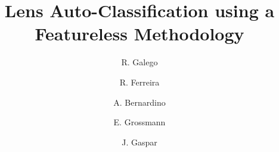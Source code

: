 \documentclass[letterpaper]{llncs}
\title{Lens Auto-Classification using a Featureless Methodology}
\author{R. Galego\inst{1} \and R. Ferreira\inst{1} \and A. Bernardino\inst{1} \and E. Grossmann\inst{2} \and J. Gaspar\inst{1}
}
\institute{Institute for Systems and Robotics, IST/UTL, Portugal\\
\email{\{rgalego,ricardo,alex,jag\}@isr.ist.utl.pt}, \\ 
\and
Intel Corp., Menlo Park, USA\\
\email{etienne@egdn.net} \\ 
}
\begin{document}
\maketitle

\begin{abstract}

\end{abstract}









%
%
%
%















%



\end{document}
